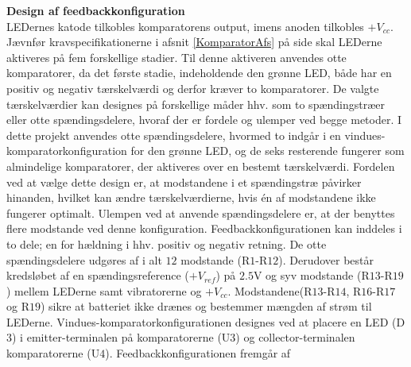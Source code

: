 \noindent\textbf{Design af feedbackkonfiguration} \\
LEDernes katode tilkobles komparatorens output, imens anoden tilkobles $+V_{cc}$. Jævnfør kravspecifikationerne i afsnit \ref{KomparatorAfs} på side \pageref{KomparatorAfs} skal LEDerne aktiveres på fem forskellige stadier. Til denne aktiveren anvendes otte komparatorer, da det første stadie, indeholdende den grønne LED, både har en positiv og negativ tærskelværdi og derfor kræver to komparatorer. De valgte tærskelværdier kan designes på forskellige måder hhv. som to spændingstræer eller otte spændingsdelere, hvoraf der er fordele og ulemper ved begge metoder. I dette projekt anvendes otte spændingsdelere, hvormed to indgår i en vindues-komparatorkonfiguration for den grønne LED, og de seks resterende fungerer som almindelige komparatorer, der aktiveres over en bestemt tærskelværdi. Fordelen ved at vælge dette design er, at modstandene i et spændingstræ påvirker hinanden, hvilket kan ændre tærskelværdierne, hvis én af modstandene ikke fungerer optimalt. Ulempen ved at anvende spændingsdelere er, at der benyttes flere modstande ved denne konfiguration. Feedbackkonfigurationen kan inddeles i to dele; en for hældning i hhv. positiv og negativ retning. De otte spændingsdelere udgøres af i alt $12$ modstande (R$1$-R$12$). Derudover består kredsløbet af en spændingsreference ($+V_{ref}$) på $2.5$V og syv modstande (R$13$-R$19$) mellem LEDerne samt vibratorerne og $+V_{cc}$. Modstandene(R$13$-R$14$, R$16$-R$17$ og R$19$) sikre at batteriet ikke drænes og bestemmer mængden af strøm til LEDerne. Vindues-komparatorkonfigurationen designes ved at placere en LED (D$3$) i emitter-terminalen på komparatorerne (U$3$) og collector-terminalen komparatorerne (U$4$). Feedbackkonfigurationen fremgår af  

